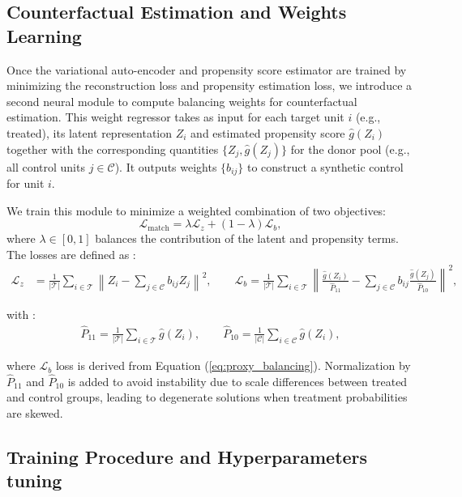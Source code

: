 \documentclass[10pt]{article} %
\begin{document}
\subsection{Counterfactual Estimation and Weights Learning}

Once the variational auto-encoder and propensity score estimator are trained {by minimizing the reconstruction loss and propensity estimation loss}, we introduce a second neural module to compute balancing weights for counterfactual estimation. This weight regressor takes as input for each target unit $i$ (e.g., treated), its latent representation \( Z_i \) and estimated propensity score \( \hat{g}(Z_i) \) together with the corresponding quantities \( \{Z_j, \hat{g}(Z_j)\} \) for the donor pool (e.g., all control units \( j \in \mathcal{C} \)). It outputs weights \( \{b_{ij}\} \) to construct a synthetic control for unit \( i \).

We train this module to minimize a weighted combination of two objectives:
\[
\mathcal{L}_{\text{match}} = \lambda\mathcal{L}_z + (1 - \lambda) \mathcal{L}_b,
\]
where \( \lambda \in [0,1] \) balances the contribution of the latent and propensity terms. The losses are defined as : 
\begin{align*}
\mathcal{L}_z &= \frac{1}{|\mathcal{T}|} \sum_{i \in \mathcal{T}} \left\| Z_i - \sum_{j \in \mathcal{C}} b_{ij} Z_j \right\|^2,\qquad 
\mathcal{L}_b = \frac{1}{|\mathcal{T}|} \sum_{i \in \mathcal{T}} \left\| \frac{\hat{g}(Z_i)}{\hat{P}_{11}} - \sum_{j \in \mathcal{C}} b_{ij} \frac{\hat{g}(Z_j)}{\hat{ P}_{10}} \right\|^2,
\end{align*}

 with :
 \begin{align}
 \hat{P}_{11} = \frac{1}{|\mathcal{T}|} \sum_{i \in \mathcal{T}} \hat{g}(Z_i) , \qquad \hat{ P}_{10} = \frac{1}{|\mathcal{C}|} \sum_{i \in \mathcal{C}} \hat{g}(Z_i), \label{eq:probability_T}
 \end{align}
 

 where \(\mathcal{L}_b \) loss is derived from Equation (\ref{eq:proxy_balancing}). Normalization by \( \hat{P}_{11} \) and \( \hat{P}_{10} \) is added to avoid  instability due to scale differences between treated and control groups, leading to degenerate solutions when treatment probabilities are skewed.
 
\subsection{Training Procedure and Hyperparameters tuning}
\end{document}
